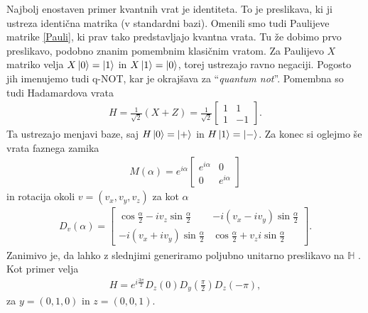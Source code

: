 \documentclass[mat1]{fmfdelo}
\newcommand{\Hb}{\mathbb H}
\begin{document}
Najbolj enostaven primer kvantnih vrat je identiteta. To je preslikava, ki ji ustreza identična matrika (v standardni bazi). Omenili smo tudi Paulijeve matrike \ref{Pauli}, ki prav tako predstavljajo kvantna vrata. Tu že dobimo prvo preslikavo, podobno znanim pomembnim klasičnim vratom. Za Paulijevo \(X\) matriko velja \(X\ket0=\ket1\) in \(X\ket1=\ket0\), torej ustrezajo ravno negaciji. Pogosto jih imenujemo tudi q-NOT, kar je okrajšava za ``\emph{quantum not}''. Pomembna so tudi Hadamardova vrata
\begin{align*}
    H = \frac{1}{\sqrt{2}}(X+Z) = \frac{1}{\sqrt2} \begin{bmatrix}
        1&1\\1&-1
    \end{bmatrix}.
\end{align*}
Ta ustrezajo menjavi baze, saj \(H\ket0=\ket+\) in \(H\ket1=\ket-\). Za konec si oglejmo še vrata faznega zamika 
\begin{align*}
    M(\alpha) = e^{i\alpha}\begin{bmatrix}
        e^{i\alpha}&0\\0&e^{i\alpha}
    \end{bmatrix}
\end{align*}
in rotacija okoli \(v=(v_x,v_y,v_z)\) za kot \(\alpha\)
\begin{align*}
    D_v(\alpha) = \begin{bmatrix}
        \cos\frac\alpha2 - iv_z\sin\frac\alpha2 & -i(v_x-iv_y)\sin\frac\alpha2\\
        -i(v_x+iv_y)\sin\frac\alpha2 & \cos\frac\alpha2 + v_zi\sin\frac\alpha2
    \end{bmatrix}.
\end{align*}
Zanimivo je, da lahko z slednjimi generiramo poljubno unitarno preslikavo na \(\Hb\) \cite[Lema 2.35]{mathforqm}. Kot primer velja 
\begin{align*}
    H = e^{i\frac{3\pi}{2}}D_z(0)D_y\left(\frac\pi2\right)D_z(-\pi),
\end{align*}
za \(y=(0,1,0)\) in \(z=(0,0,1)\).
\end{document}

